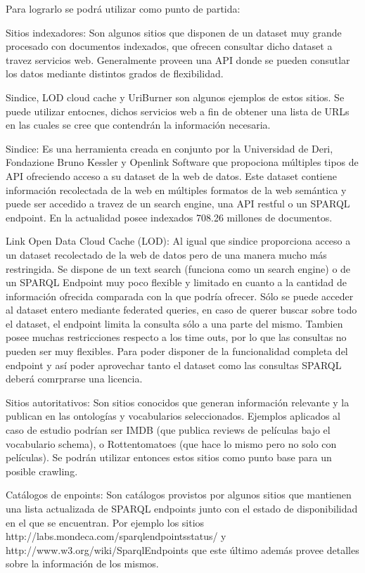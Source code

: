 Para lograrlo se podrá utilizar como punto de partida:

Sitios indexadores: Son algunos sitios que disponen de un dataset muy grande procesado con documentos indexados, que ofrecen consultar dicho 
dataset a travez servicios web. Generalmente proveen una API donde se pueden consutlar los datos mediante distintos grados de flexibilidad.

Sindice, LOD cloud cache y UriBurner son algunos ejemplos de estos sitios. Se puede utilizar entocnes, dichos servicios web a fin
de obtener una lista de URLs en las cuales se cree que contendrán la información necesaria.

Sindice: Es una herramienta creada en conjunto por la Universidad de Deri,  Fondazione Bruno Kessler y Openlink Software que propociona múltiples tipos de API ofreciendo acceso a su dataset de la web de datos. Este dataset contiene información recolectada de la web en múltiples formatos de la web semántica y puede ser accedido a travez de un search engine, una API restful o un SPARQL endpoint.  
En la actualidad posee indexados 708.26 millones de documentos.

Link Open Data Cloud Cache (LOD): Al igual que sindice proporciona acceso a un dataset recolectado de la web de datos pero de una manera mucho más restringida. Se dispone de un text search (funciona como un search engine) o de un SPARQL Endpoint muy poco flexible y limitado en cuanto a la cantidad de información ofrecida comparada con la que podría ofrecer. Sólo se puede acceder al dataset entero mediante federated queries, en caso de querer buscar sobre todo el dataset, el endpoint limita la consulta sólo a una parte del mismo. Tambien posee muchas restricciones respecto a los time outs, por lo que las consultas no pueden ser muy flexibles.
Para poder disponer de la funcionalidad completa del endpoint y así poder aprovechar tanto el dataset como las consultas SPARQL deberá comrprarse una licencia.

Sitios autoritativos: Son sitios conocidos que generan información relevante y la publican en las ontologías y vocabularios 
seleccionados. Ejemplos aplicados al caso de estudio podrían ser IMDB (que publica reviews de películas bajo el vocabulario schema), o Rottentomatoes
(que hace lo mismo pero no solo con películas). Se podrán utilizar entonces estos sitios como punto base para un posible crawling.

Catálogos de enpoints: Son catálogos provistos por algunos sitios que mantienen una lista actualizada de SPARQL endpoints 
junto con el estado de disponibilidad en el que se encuentran. Por ejemplo los sitios http://labs.mondeca.com/sparqlendpointsstatus/ y 
http://www.w3.org/wiki/SparqlEndpoints que este último además provee detalles sobre la información de los mismos.

